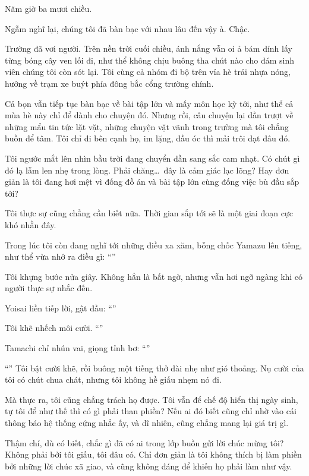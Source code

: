 \documentclass[../main.tex]{subfiles}
\begin{document}
\ct

Năm giờ ba mươi chiều.

Ngẫm nghĩ lại, chúng tôi đã bàn bạc với nhau lâu đến vậy à. Chậc.

Trường đã vơi người. Trên nền trời cuối chiều, ánh nắng vẫn oi ả bám dính lấy từng bóng cây ven lối đi, như thể không chịu buông tha chút nào cho đám sinh viên chúng tôi còn sót lại. Tôi cùng cả nhóm đi bộ trên vỉa hè trải nhựa nóng, hướng về trạm xe buýt phía đông bắc cổng trường chính.

Cả bọn vẫn tiếp tục bàn bạc về bài tập lớn và mấy môn học kỳ tới, như thể cả mùa hè này chỉ để dành cho chuyện đó. Nhưng rồi, câu chuyện lại dần trượt về những mẩu tin tức lặt vặt, những chuyện vặt vãnh trong trường mà tôi chẳng buồn để tâm. Tôi chỉ đi bên cạnh họ, im lặng, đầu óc thì mải trôi dạt đâu đó.

Tôi ngước mắt lên nhìn bầu trời đang chuyển dần sang sắc cam nhạt. Có chút gì đó lạ lẫm len nhẹ trong lòng. Phải chăng\dots\ đây là cảm giác lạc lõng? Hay đơn giản là tôi đang hơi mệt vì đống đồ án và bài tập lớn cùng đống việc bù đầu sắp tới?

Tôi thực sự cũng chẳng cần biết nữa. Thời gian sắp tới sẽ là một giai đoạn cực khó nhằn đây.

Trong lúc tôi còn đang nghĩ tới những điều xa xăm, bỗng chốc Yamazu lên tiếng, như thể vừa nhớ ra điều gì: ``''

Tôi khựng bước nửa giây. Không hẳn là bất ngờ, nhưng vẫn hơi ngỡ ngàng khi có người thực sự nhắc đến.

Yoisai liền tiếp lời, gật đầu: ``''

Tôi khẽ nhếch môi cười. ``''

Tamachi chỉ nhún vai, giọng tỉnh bơ: ``''

``'' Tôi bật cười khẽ, rồi buông một tiếng thở dài nhẹ như gió thoảng. Nụ cười của tôi có chút chua chát, nhưng tôi không hề giấu nhẹm nó đi.

Mà thực ra, tôi cũng chẳng trách họ được. Tôi vẫn để chế độ hiển thị ngày sinh, tự tôi để như thế thì có gì phải than phiền? Nếu ai đó biết cũng chỉ nhờ vào cái thông báo hệ thống cứng nhắc ấy, và dĩ nhiên, cũng chẳng mang lại giá trị gì.

Thậm chí, dù có biết, chắc gì đã có ai trong lớp buồn gửi lời chúc mừng tôi? Không phải bởi tôi giấu, tôi đâu có. Chỉ đơn giản là tôi không thích bị làm phiền bởi những lời chúc xã giao, và cũng không đáng để khiến họ phải làm như vậy.
\end{document}
